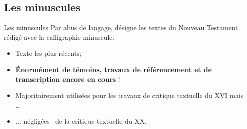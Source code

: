 \documentclass[11pt]{beamer}
\begin{document}

\subsection{Les minuscules}

\begin{frame}{Les minuscules}
Par abus de langage, désigne les textes du Nouveau Testament rédigé avec la calligraphie minuscule.
\pause
\begin{block}{}
    \begin{itemize}
        \item Texte les plus récents;
        \item \textbf{Énormément de témoins, travaux de référencement et de transcription encore en cours} !
        \item Majoritairement utilisées pour les travaux de critique textuelle du XVI\ieme{} mais \dots
        \item ... \og négligées \fg\ de la critique textuelle du XX\ieme{}.
    \end{itemize}
\end{block}

\end{frame}
\end{document}
